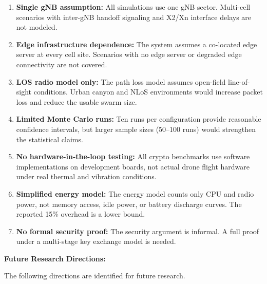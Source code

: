 \documentclass{ieeeaccess}
\begin{document}
\begin{enumerate}
\item \textbf{Single gNB assumption:} All simulations use one gNB sector. Multi-cell scenarios with inter-gNB handoff signaling and X2/Xn interface delays are not modeled.
\item \textbf{Edge infrastructure dependence:} The system assumes a co-located edge server at every cell site. Scenarios with no edge server or degraded edge connectivity are not covered.
\item \textbf{LOS radio model only:} The path loss model assumes open-field line-of-sight conditions. Urban canyon and NLoS environments would increase packet loss and reduce the usable swarm size.
\item \textbf{Limited Monte Carlo runs:} Ten runs per configuration provide reasonable confidence intervals, but larger sample sizes (50--100 runs) would strengthen the statistical claims.
\item \textbf{No hardware-in-the-loop testing:} All crypto benchmarks use software implementations on development boards, not actual drone flight hardware under real thermal and vibration conditions.
\item \textbf{Simplified energy model:} The energy model counts only CPU and radio power, not memory access, idle power, or battery discharge curves. The reported 15\% overhead is a lower bound.
\item \textbf{No formal security proof:} The security argument is informal. A full proof under a multi-stage key exchange model is needed.
\end{enumerate}

\vspace{2mm}\noindent\textbf{Future Research Directions:}

The following directions are identified for future research.
\end{document}
